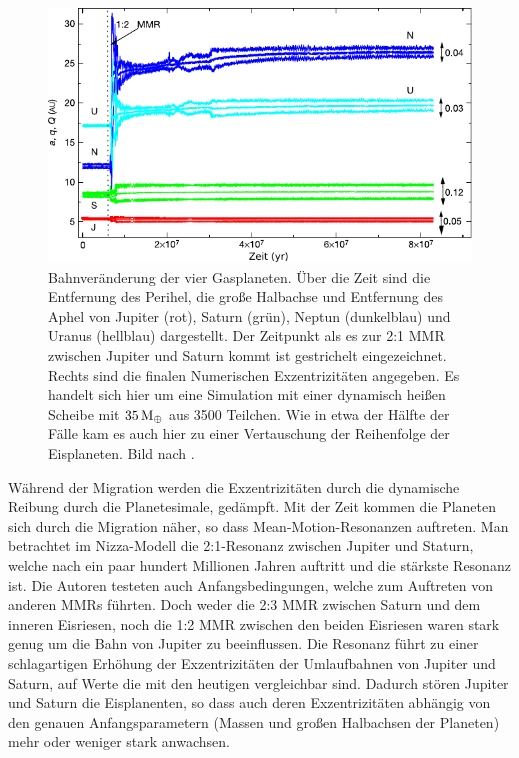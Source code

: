 \documentclass[12pt,a4paper,twoside]{article}
\renewcommand{\cite}{\citep}
\newcommand{\ME}{M_\oplus}
\begin{document}
\begin{figure}[tbn]
\centering
\includegraphics[scale=1]{img/Tsiganis2005-1.pdf}
\caption{Bahnveränderung der vier Gasplaneten. Über die Zeit sind die Entfernung des Perihel, die große Halbachse und Entfernung des Aphel von Jupiter (rot), Saturn (grün), Neptun (dunkelblau) und Uranus (hellblau) dargestellt. Der Zeitpunkt als es zur 2:1 MMR zwischen Jupiter und Saturn kommt ist gestrichelt eingezeichnet. Rechts sind die finalen Numerischen Exzentrizitäten angegeben. Es handelt sich hier um eine Simulation mit einer dynamisch heißen Scheibe mit $\unit[35]{\ME}$ aus 3500 Teilchen. Wie in etwa der Hälfte der Fälle kam es auch hier zu einer Vertauschung der Reihenfolge der Eisplaneten. Bild nach \cite{Tsiganis2005}.}
\label{fig:Orbitalevolution}
\end{figure}
Während der Migration werden die Exzentrizitäten durch die dynamische Reibung durch die Planetesimale, gedämpft\cite{Tsiganis2005}.
Mit der Zeit kommen die Planeten sich durch die Migration näher, so dass Mean-Motion-Resonanzen auftreten.
Man betrachtet im Nizza-Modell die 2:1-Resonanz zwischen Jupiter und Staturn, welche nach ein paar hundert Millionen Jahren auftritt und die stärkste Resonanz ist. %
Die Autoren testeten auch Anfangsbedingungen, welche zum Auftreten von anderen MMRs führten. Doch weder die 2:3 MMR zwischen Saturn und dem inneren Eisriesen, noch die 1:2 MMR zwischen den beiden Eisriesen waren stark genug um die Bahn von Jupiter zu beeinflussen\cite{Tsiganis2005}. %
Die Resonanz führt zu einer schlagartigen Erhöhung der Exzentrizitäten der Umlaufbahnen von Jupiter und Saturn, auf Werte die mit den heutigen vergleichbar sind. %
Dadurch stören Jupiter und Saturn die Eisplanenten, so dass auch deren Exzentrizitäten abhängig von den genauen Anfangsparametern (Massen und großen Halbachsen der Planeten) mehr oder weniger stark anwachsen\cite{Tsiganis2005}.
\end{document}

